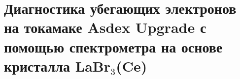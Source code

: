 \chapter{Диагностика убегающих электронов на токамаке Asdex Upgrade с помощью спектрометра на основе кристалла LaBr${}_3$(Ce)}\label{ch:ch4}

\FloatBarrier
